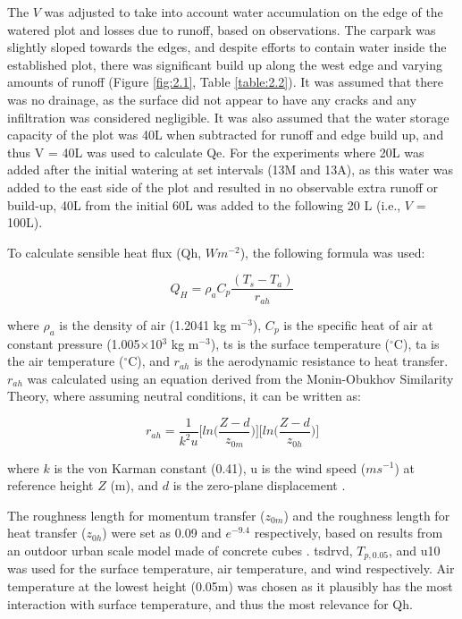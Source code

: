 \documentclass[final,3p,times,authoryear]{elsarticle}
\begin{document}
The $V$ was adjusted to take into account water accumulation on the edge of the watered plot and losses due to runoff, based on observations. The carpark was slightly sloped towards the edges, and despite efforts to contain water inside the established plot, there was significant build up along the west edge and varying amounts of runoff (Figure \ref{fig:2.1}, Table \ref{table:2.2}). It was assumed that there was no drainage, as the surface did not appear to have any cracks and any infiltration was considered negligible. It was also assumed that the water storage capacity of the plot was 40L when subtracted for runoff and edge build up, and thus V = 40L was used to calculate \gls{Qe}. For the experiments where 20L was added after the initial watering at set intervals (13M and 13A), as this water was added to the east side of the plot and resulted in no observable extra runoff or build-up, 40L from the initial 60L was added to the following 20 L (i.e., $V$ = 100L).

To calculate sensible heat flux (\gls{Qh}, $Wm^{-2}$), the following formula was used:

\begin{equation}
Q_{H} = \rho_{a}C_{p} \frac{ (T_{s} - T_{a}) }{r_{ah}}
\label{eq:7.12}
\end{equation}

where $\rho_{a}$ is the density of air (1.2041 kg m$^{-3}$), $C_{p}$ is the specific heat of air at constant pressure (1.005$\times$10$^{3}$ kg m$^{-3}$), \gls{ts} is the surface temperature ($^{\circ}$C), \gls{ta} is the air temperature ($^{\circ}$C), and $r_{ah}$ is the aerodynamic resistance to heat transfer. $r_{ah}$ was calculated using an equation derived from the Monin-Obukhov Similarity Theory, where assuming neutral conditions, it can be written as:

\begin{equation}
r_{ah} = \frac{1}{k^{2}u}\bigg[ln\bigg( \frac{Z-d}{z_{0m}} \bigg) \bigg] \bigg[ln\bigg( \frac{Z-d}{z_{0h}} \bigg) \bigg]
\label{eq:7.13}
\end{equation}

where $k$ is the von Karman constant (0.41), \gls{u} is the wind speed ($ms^{-1}$) at reference
height $Z$ (m), and $d$ is the zero-plane displacement \citep{Liu2007}.

The roughness length for momentum transfer ($z_{0m}$) and the roughness length for heat transfer ($z_{0h}$) were set as 0.09 and $e^{-9.4}$ respectively, based on results from an outdoor urban scale model made of concrete cubes \citep{Kanda2007}. \gls{tsdrvd}, $T_{p,0.05}$, and \gls{u10} was used for the surface temperature, air temperature, and wind respectively. Air temperature at the lowest height (0.05m) was chosen as it plausibly has the most interaction with surface temperature, and thus the most relevance for \gls{Qh}.
\end{document}
